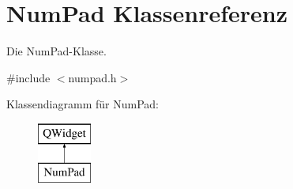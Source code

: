 \hypertarget{class_num_pad}{}\section{Num\+Pad Klassenreferenz}
\label{class_num_pad}


Die Num\+Pad-\/\+Klasse.  




{\ttfamily \#include $<$numpad.\+h$>$}

Klassendiagramm für Num\+Pad\+:\begin{figure}[H]
\begin{center}
\leavevmode
\includegraphics[height=2.000000cm]{class_num_pad}
\end{center}
\end{figure}
